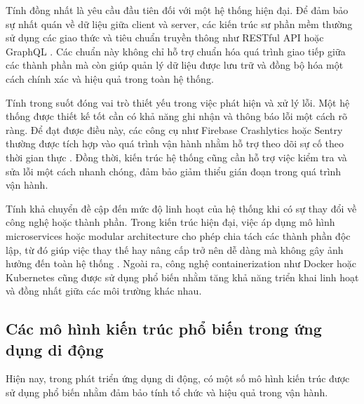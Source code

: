         \vspace{0.5em}
    
        Tính đồng nhất là yêu cầu đầu tiên đối với một hệ thống hiện đại. Để đảm bảo sự nhất quán về dữ liệu giữa client và server, các kiến trúc sư phần mềm thường sử dụng các giao thức và tiêu chuẩn truyền thông như RESTful API hoặc GraphQL \cite{restgraphql}. Các chuẩn này không chỉ hỗ trợ chuẩn hóa quá trình giao tiếp giữa các thành phần mà còn giúp quản lý dữ liệu được lưu trữ và đồng bộ hóa một cách chính xác và hiệu quả trong toàn hệ thống.
      
        \vspace{0.5em}
      
        Tính trong suốt đóng vai trò thiết yếu trong việc phát hiện và xử lý lỗi. Một hệ thống được thiết kế tốt cần có khả năng ghi nhận và thông báo lỗi một cách rõ ràng. Để đạt được điều này, các công cụ như Firebase Crashlytics hoặc Sentry thường được tích hợp vào quá trình vận hành nhằm hỗ trợ theo dõi sự cố theo thời gian thực \cite{firebasecrashlytics}. Đồng thời, kiến trúc hệ thống cũng cần hỗ trợ việc kiểm tra và sửa lỗi một cách nhanh chóng, đảm bảo giảm thiểu gián đoạn trong quá trình vận hành.
      
        \vspace{0.5em}
      
        Tính khả chuyển đề cập đến mức độ linh hoạt của hệ thống khi có sự thay đổi về công nghệ hoặc thành phần. Trong kiến trúc hiện đại, việc áp dụng mô hình microservices hoặc modular architecture cho phép chia tách các thành phần độc lập, từ đó giúp việc thay thế hay nâng cấp trở nên dễ dàng mà không gây ảnh hưởng đến toàn hệ thống \cite{microservices}. Ngoài ra, công nghệ containerization như Docker hoặc Kubernetes cũng được sử dụng phổ biến nhằm tăng khả năng triển khai linh hoạt và đồng nhất giữa các môi trường khác nhau.
      

    \subsection{Các mô hình kiến trúc phổ biến trong ứng dụng di động}
    \renewcommand{\labelitemi}{--}
    
        Hiện nay, trong phát triển ứng dụng di động, có một số mô hình kiến trúc được sử dụng phổ biến nhằm đảm bảo tính tổ chức và hiệu quả trong vận hành.
    
        \vspace{0.5em}
    
